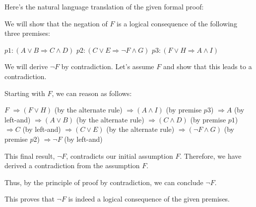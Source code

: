 \documentclass[a4paper]{article}
\begin{document}
                                Here's the natural language translation of the given formal proof:

We will show that the negation of $F$ is a logical consequence of the following three premises:

$p1: (A \lor B \Rightarrow C \land D)$
$p2: (C \lor E \Rightarrow \neg F \land G)$
$p3: (F \lor H \Rightarrow A \land I)$

We will derive $\neg F$ by contradiction. Let's assume $F$ and show that this leads to a contradiction.

Starting with $F$, we can reason as follows:

$F$
$\Rightarrow (F \lor H)$ (by the alternate rule)
$\Rightarrow (A \land I)$ (by premise $p3$)
$\Rightarrow A$ (by left-and)
$\Rightarrow (A \lor B)$ (by the alternate rule)
$\Rightarrow (C \land D)$ (by premise $p1$)
$\Rightarrow C$ (by left-and)
$\Rightarrow (C \lor E)$ (by the alternate rule)
$\Rightarrow (\neg F \land G)$ (by premise $p2$)
$\Rightarrow \neg F$ (by left-and)

This final result, $\neg F$, contradicts our initial assumption $F$. Therefore, we have derived a contradiction from the assumption $F$.

Thus, by the principle of proof by contradiction, we can conclude $\neg F$.

This proves that $\neg F$ is indeed a logical consequence of the given premises.
\end{document}
